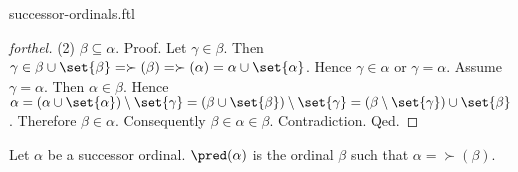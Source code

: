\documentclass{naproche-library}
\begin{document}
\begin{smodule}{successor-ordinals.ftl}
\begin{proof}[forthel]
    (2) $\beta \subseteq \alpha$. \newline
    Proof.
      Let $\gamma \in \beta$.
      Then $\gamma \in \beta \cup \set{\beta}
        = \succ(\beta)
        = \succ(\alpha)
        = \alpha \cup \set{\alpha}$.
      Hence $\gamma \in \alpha$ or $\gamma = \alpha$.
      Assume $\gamma = \alpha$.
      Then $\alpha \in \beta$.
      Hence $\alpha
        = (\alpha \cup \set{\alpha}) \setminus \set{\gamma}
        = (\beta \cup \set{\beta}) \setminus \set{\gamma}
        = (\beta \setminus \set{\gamma}) \cup \set{\beta}$.
      Therefore $\beta \in \alpha$.
      Consequently $\beta \in \alpha \in \beta$.
      Contradiction.
    Qed.
  \end{proof}

  \begin{definition}[forthel,id=SET_THEORY_02_735071524880384]
    Let $\alpha$ be a successor ordinal.
    $\pred(\alpha)$ is the ordinal $\beta$ such that $\alpha = \succ(\beta)$.
  \end{definition}
\end{smodule}
\end{document}
